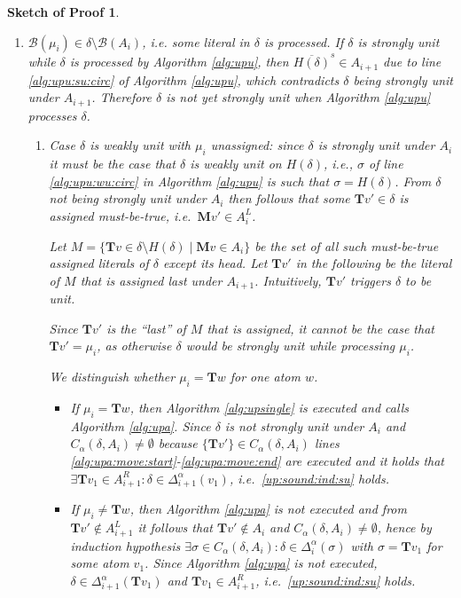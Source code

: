 \documentclass[final]{vutinfth} %
\newtheorem{proof-sketch}{Sketch of Proof}[chapter]
\newcommand{\mbt}{must-be-true\xspace}
\newcommand{\negstrong}[1]{\overline{#1}^s}
\newcommand{\bass}{\mathcal{B}}
\newcommand{\bpro}{\mathcal{B}}
\newcommand{\ass}{A}
\newcommand{\bT}{\mathbf{T}}
\newcommand{\bM}{\mathbf{M}}
\newcommand{\cdal}{C_\alpha}
\newcommand{\dal}{\Delta^\alpha}
\newcommand{\headf}{H}
\newcommand{\sgl}{\mu}
\newcommand{\bsgl}{\sigma}
\begin{document}
\begin{proof-sketch}
\begin{enumerate}
\begin{enumerate}
\begin{enumerate}
	\item 	$\bpro(\sgl_i) \in \delta \setminus \bass(\ass_i)$, i.e. some literal in $\delta$ is processed. If $\delta$ is strongly unit while $\delta$ is processed by Algorithm \ref{alg:upu}, then $\negstrong{\headf(\delta)} \in \ass_{i+1}$ due to line \ref{alg:upu:su:circ} of Algorithm \ref{alg:upu}, which contradicts $\delta$ being strongly unit under $\ass_{i+1}$. Therefore $\delta$ is not yet strongly unit when Algorithm \ref{alg:upu} processes $\delta$.
	

	\begin{enumerate}
		\item Case $\delta$ is weakly unit with $\sgl_i$ unassigned: since $\delta$ is strongly unit under $\ass_i$ it must be the case that $\delta$ is weakly unit on $\headf(\delta)$, i.e., $\bsgl$ of line \ref{alg:upu:wu:circ} in Algorithm \ref{alg:upu} is such that $\bsgl = \headf(\delta)$. From $\delta$ not being strongly unit under $\ass_i$  then follows that some $\bT v' \in \delta$ is assigned \emph{\mbt}, i.e.~$\bM v' \in \ass_i^L$.
	
	Let $M = \{ \bT v \in \delta \setminus \headf(\delta) \mid \bM v \in \ass_i \}$ be the set of all such \emph{\mbt} assigned literals of $\delta$ except its head. Let $\bT v'$ in the following be the literal of $M$ that is assigned last under $\ass_{i+1}$. Intuitively, $\bT v'$ triggers $\delta$ to be unit.
	
	Since $\bT v'$ is the \enquote{last} of $M$ that is assigned, it cannot be the case that $\bT v' = \sgl_i$, as otherwise $\delta$ would be strongly unit while processing $\sgl_i$.
	
	We distinguish whether $\sgl_i = \bT w$ for one atom $w$.
	
	\begin{itemize}
		\item If $\sgl_i = \bT w$, then Algorithm \ref{alg:upsingle} is executed and calls Algorithm \ref{alg:upa}. Since $\delta$ is not strongly unit under $\ass_i$ and $\cdal(\delta, \ass_i) \not = \emptyset$ because $\{ \bT v' \} \in \cdal(\delta, \ass_i)$ lines \ref{alg:upa:move:start}-\ref{alg:upa:move:end} are executed and it holds that $\exists \bT v_1 \in \ass_{i+1}^R : \delta \in \dal_{i+1}(v_1)$, i.e.~\ref{up:sound:ind:su} holds.
	
		\item If $\sgl_i \not = \bT w$, then Algorithm \ref{alg:upa} is not executed and from $\bT v' \not \in \ass_{i+1}^L$ it follows that $\bT v' \not \in \ass_i$ and $\cdal(\delta, \ass_i) \not = \emptyset$, hence by induction hypothesis $\exists \bsgl \in \cdal(\delta, \ass_i) : \delta \in \dal_i(\bsgl)$ with $\bsgl = \bT v_1$ for some atom $v_1$. Since Algorithm \ref{alg:upa} is not executed, $\delta \in \dal_{i+1}(\bT v_1)$ and $\bT v_1 \in \ass_{i+1}^R$, i.e.~\ref{up:sound:ind:su} holds.
	

\end{itemize}
\end{enumerate}
\end{enumerate}
\end{enumerate}
\end{enumerate}
\end{proof-sketch}
\end{document}
